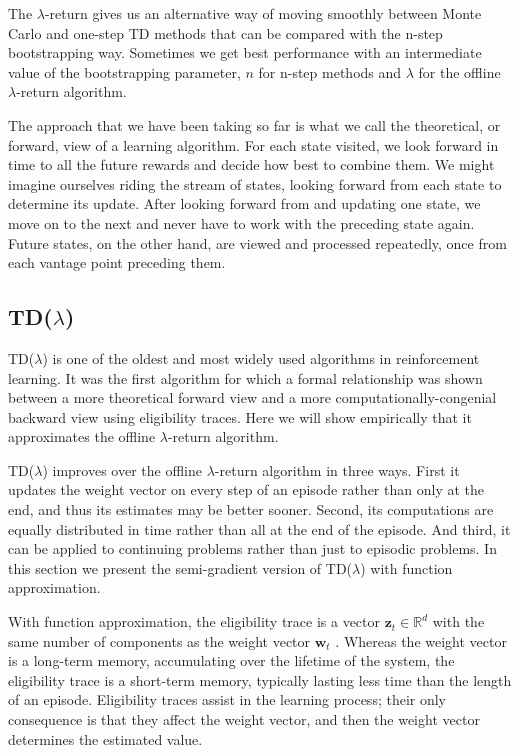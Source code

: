\documentclass{article}
\begin{document}
The $\lambda$-return gives us an alternative way of moving smoothly between Monte Carlo and one-step TD methods that can be compared with the n-step bootstrapping way. Sometimes we get best performance with an intermediate value of the bootstrapping parameter, $n$ for n-step methods and $\lambda$ for the offline $\lambda$-return algorithm.

The approach that we have been taking so far is what we call the theoretical, or forward, view of a learning algorithm. For each state visited, we look forward in time to all the future rewards and decide how best to combine them. We might imagine ourselves riding the stream of states, looking forward from each state to determine its update. 
After looking forward from and updating one state, we move on to the next and never have to work with the preceding state again. Future states, on the other hand, are viewed and processed repeatedly, once from each vantage point preceding them.

\subsection{TD(\texorpdfstring{$\lambda$}{lambda})}

TD($\lambda$) is one of the oldest and most widely used algorithms in reinforcement learning. It was the first algorithm for which a formal relationship was shown between a more theoretical forward view and a more computationally-congenial backward view using eligibility traces. 
Here we will show empirically that it approximates the offline $\lambda$-return algorithm.

TD($\lambda$) improves over the offline $\lambda$-return algorithm in three ways. First it updates the weight vector on every step of an episode rather than only at the end, and thus its estimates may be better sooner. Second, its computations are equally distributed in time 
rather than all at the end of the episode. And third, it can be applied to continuing problems rather than just to episodic problems. In this section we present the semi-gradient version of TD($\lambda$) with function approximation.

With function approximation, the eligibility trace is a vector $\mathbf { z } _ { t } \in \mathbb { R } ^ { d }$ with the same number of components as the weight vector $\mathbf { w } _ { t }$ . Whereas the weight vector is a long-term memory, accumulating over the lifetime of the system, 
the eligibility trace is a short-term memory, typically lasting less time than the length of an episode. Eligibility traces assist in the learning process; their only consequence is that they affect the weight vector, and then the weight vector determines the estimated value.
\end{document}
